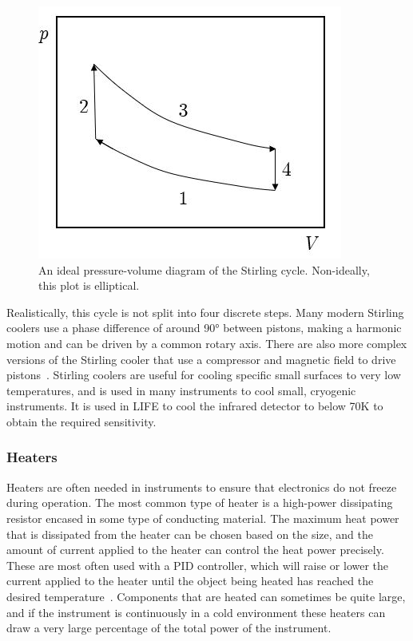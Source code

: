 \begin{figure}[h]
\centering
  \includegraphics[width=0.5\linewidth]{chap2_images/stirling_cycle.JPG}
  \caption{An ideal pressure-volume diagram of the Stirling cycle. Non-ideally, this plot is elliptical.}
  \label{fig:stirling_cycle}
\end{figure}

Realistically, this cycle is not split into four discrete steps. Many modern Stirling coolers use a phase difference of around 90° between pistons, making a harmonic motion and can be driven by a common rotary axis. There are also more complex versions of the Stirling cooler that use a compressor and magnetic field to drive pistons~\citep{cryocoolers}. Stirling coolers are useful for cooling specific small surfaces to very low temperatures, and is used in many instruments to cool small, cryogenic instruments. It is used in LIFE to cool the infrared detector to below 70K to obtain the required sensitivity.

\subsubsection{Heaters} %

Heaters are often needed in instruments to ensure that electronics do not freeze during operation. The most common type of heater is a high-power dissipating resistor encased in some type of conducting material. The maximum heat power that is dissipated from the heater can be chosen based on the size, and the amount of current applied to the heater can control the heat power precisely. These are most often used with a PID controller, which will raise or lower the current applied to the heater until the object being heated has reached the desired temperature~\citep{SMAD}. Components that are heated can sometimes be quite large, and if the instrument is continuously in a cold environment these heaters can draw a very large percentage of the total power of the instrument. 


